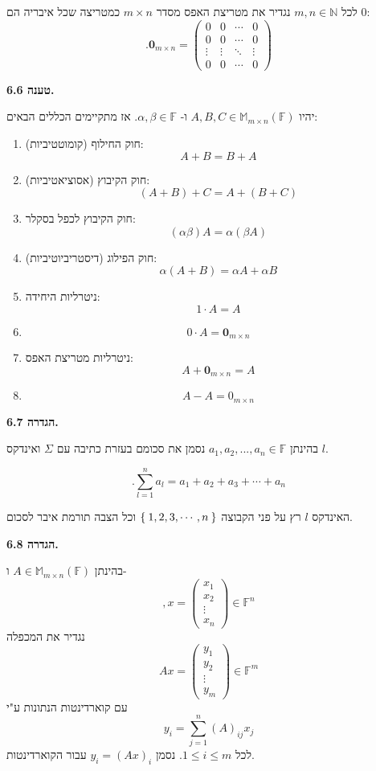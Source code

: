 \documentclass[12pt]{report}
\theoremstyle{plain}
\theoremstyle{definition}
\newcommand{\N}{\mathbb{N}}
\newcommand{\F}{\mathbb{F}}
\newcommand{\M}{\mathbb{M}}
\newcommand{\0}{\mathbf{0}}
\begin{document}
לכל 
$m,n\in\N$
נגדיר את מטריצת האפס מסדר
$m\times n$
כמטריצה שכל איבריה הם
$0$:
$$
.\0_{m\times n}=\begin{pmatrix}0 &0 &\cdots &0 \\
0 &0 &\cdots &0 \\
\vdots & \vdots &\ddots &\vdots\\
0 &0 &\cdots &0
\end{pmatrix}
$$
\bigskip
\bigskip

\noindent\textbf{טענה 6.6.}

יהיו 
$A,B,C\in\M_{m\times n}(\F)$
ו-
$\alpha,\beta\in\F$.
אז מתקיימים הכללים הבאים:

\begin{enumerate}[label=\alph*.]
\item
חוק החילוף (קומוטטיביות): 
$$A+B=B+A$$


\item 
חוק הקיבוץ (אסוציאטיביות):
$$(A+B)+C=A+(B+C)$$


\item 
חוק הקיבוץ לכפל בסקלר:
$$(\alpha\beta)A=\alpha(\beta A)$$


\item 
חוק הפילוג (דיסטריביוטיביות):
$$\alpha(A+B)=\alpha A+\alpha B$$


\item
ניטרליות היחידה:
$$1\cdot A=A$$


\item
$$0\cdot A=\0_{m\times n}$$


\item 
ניטרליות מטריצת האפס:
$$A+\0_{m\times n}=A$$


\item 
$$A-A=0_{m\times n}$$


\end{enumerate}
\bigskip
\bigskip

\noindent\textbf{הגדרה 6.7.}

בהינתן
$a_1,a_2,...,a_n\in\F$
נסמן את סכומם בעזרת כתיבה עם
$\Sigma$
ואינדקס
$l$.

$$
.\sum_{l=1}^n a_l=a_1+a_2+a_3+\cdots+a_n
$$

האינדקס
$l$
רץ על פני הקבוצה
$\Set{1,2,3,\cdots,n}$
וכל הצבה תורמת איבר לסכום.
\bigskip
\bigskip

\noindent\textbf{הגדרה 6.8.}

בהינתן
$A\in\M_{m\times n}(\F)$
ו-
$$
,x=\begin{pmatrix}
x_1\\
x_2\\
\vdots \\
x_n
\end{pmatrix}\in\F^n
$$
נגדיר את המכפלה
$$
Ax=\begin{pmatrix}
y_1\\
y_2\\
\vdots \\
y_m
\end{pmatrix}\in\F^m
$$
עם קוארדינטות הנתונות ע"י
$$
y_i=\sum_{j=1}^n (A)_{ij}x_j
$$
לכל
$1\leq i\leq m$.
נסמן
$y_i=(Ax)_i$ 
עבור הקוארדינטות.
\bigskip
\bigskip
\end{document}
